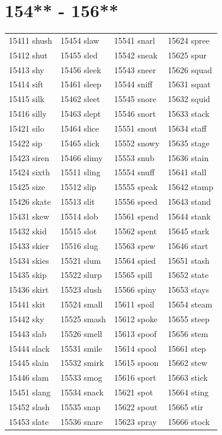 \documentclass[10pt, oneside]{book}
\begin{document}
\begin{table}
	\centering
	\section*{154** - 156**}
	\begin{tabular}{l l l l}
15411 shush &15454 slaw &15541 snarl &15624 spree\\
15412 shut &15455 sled &15542 sneak &15625 spur\\
15413 shy &15456 sleek &15543 sneer &15626 squad\\
15414 sift &15461 sleep &15544 sniff &15631 squat\\
15415 silk &15462 sleet &15545 snore &15632 squid\\
15416 silly &15463 slept &15546 snort &15633 stack\\
15421 silo &15464 slice &15551 snout &15634 staff\\
15422 sip &15465 slick &15552 snowy &15635 stage\\
15423 siren &15466 slimy &15553 snub &15636 stain\\
15424 sixth &15511 sling &15554 snuff &15641 stall\\
15425 size &15512 slip &15555 speak &15642 stamp\\
15426 skate &15513 slit &15556 speed &15643 stand\\
15431 skew &15514 slob &15561 spend &15644 stank\\
15432 skid &15515 slot &15562 spent &15645 stark\\
15433 skier &15516 slug &15563 spew &15646 start\\
15434 skies &15521 slum &15564 spied &15651 stash\\
15435 skip &15522 slurp &15565 spill &15652 state\\
15436 skirt &15523 slush &15566 spiny &15653 stays\\
15441 skit &15524 small &15611 spoil &15654 steam\\
15442 sky &15525 smash &15612 spoke &15655 steep\\
15443 slab &15526 smell &15613 spoof &15656 stem\\
15444 slack &15531 smile &15614 spool &15661 step\\
15445 slain &15532 smirk &15615 spoon &15662 stew\\
15446 slam &15533 smog &15616 sport &15663 stick\\
15451 slang &15534 snack &15621 spot &15664 sting\\
15452 slash &15535 snap &15622 spout &15665 stir\\
15453 slate &15536 snare &15623 spray &15666 stock\\
	\end{tabular}
 \end{table}
\clearpage
\end{document}

